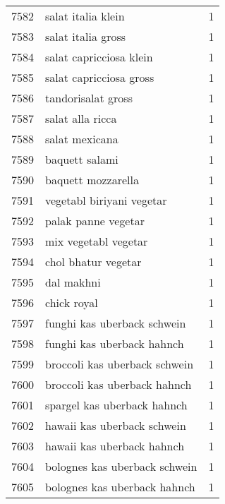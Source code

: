 \begin{tabular}{llr}
7582 &                                 salat italia klein &      1 \\
7583 &                                 salat italia gross &      1 \\
7584 &                            salat capricciosa klein &      1 \\
7585 &                            salat capricciosa gross &      1 \\
7586 &                                 tandorisalat gross &      1 \\
7587 &                                   salat alla ricca &      1 \\
7588 &                                     salat mexicana &      1 \\
7589 &                                     baquett salami &      1 \\
7590 &                                 baquett mozzarella &      1 \\
7591 &                          vegetabl biriyani vegetar &      1 \\
7592 &                                palak panne vegetar &      1 \\
7593 &                               mix vegetabl vegetar &      1 \\
7594 &                                chol bhatur vegetar &      1 \\
7595 &                                         dal makhni &      1 \\
7596 &                                        chick royal &      1 \\
7597 &                        funghi kas uberback schwein &      1 \\
7598 &                         funghi kas uberback hahnch &      1 \\
7599 &                      broccoli kas uberback schwein &      1 \\
7600 &                       broccoli kas uberback hahnch &      1 \\
7601 &                        spargel kas uberback hahnch &      1 \\
7602 &                        hawaii kas uberback schwein &      1 \\
7603 &                         hawaii kas uberback hahnch &      1 \\
7604 &                      bolognes kas uberback schwein &      1 \\
7605 &                       bolognes kas uberback hahnch &      1 \\

\end{tabular}
